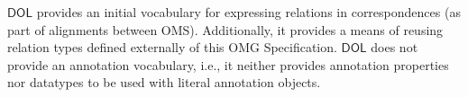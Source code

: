 \documentclass[10pt, a4paper]{isov2}
\makeatletter
\newcommand*{\eg}{e.g.,\@\xspace}
\newcommand*\CommentAuthor{}
\renewcommand*\CommentAuthor{#1}}
\newcommand*\CommentDate{}
\renewcommand*\CommentDate{#1}}
\newcommand*\CommentId{}
\renewcommand*\CommentId{#1}}
\newcommand*\CommentType{}
\renewcommand*\CommentType{#1}}
\newcommand*{\SetCommentColorByType}[1]{%
\edef\localType{{#1}}%
\expandafter\ifstrequal\localType{q-aut}{\colorlet{CommentColor}{red}}{%
\expandafter\ifstrequal\localType{q-all}{\colorlet{CommentColor}{orange}}{%
\expandafter\ifstrequal\localType{todo}{\colorlet{CommentColor}{orange}}{%
\expandafter\ifstrequal\localType{fyi}{\colorlet{CommentColor}{lightgray}}{%
\colorlet{CommentColor}{yellow}}}}}}
\newcommand*{\SetCommentPrefixByType}[1]{%
\edef\localType{{#1}}%
\expandafter\@ifmtarg\localType{%
\edef\CommentPrefix{}%
}{%
\caseupper[q]{#1}%
\edef\CommentPrefix{\thestring: }%
}}
\newcommand*{\initComment}[1]{%
\setkeys{Comment}{#1}%
\SetCommentColorByType{\CommentType}%
\relax%
\SetCommentPrefixByType{\CommentType}%
\relax%
}
\newcommand*{\todonote}[2][]{%
\initComment{#1}%
\pdfcomment[author=\CommentAuthor,color=CommentColor,date=\CommentDate,id=\CommentId]{%
\CommentPrefix
#2}}
\renewcommand*{\todonote}[2][]{%
\initComment{#1}%
\ednote{\CommentPrefix #2}}
\newcommand*{\CLnote}[2][author=Christoph Lange]{%
\todonote[author=Christoph Lange,#1]{#2}}
\newcommand*{\IS}{OMG Specification\xspace}
\newcommand*{\DOL}{\ensuremath{\mathsf{DOL}}\xspace}
\makeatother
\begin{document}
\DOL provides an initial vocabulary for expressing relations in correspondences (as part of alignments between OMS).  Additionally, it provides a means of reusing relation types defined externally of this \IS.
\DOL does not provide an annotation vocabulary, i.e., it neither provides annotation properties nor datatypes to be used with literal annotation objects.


\end{document}
